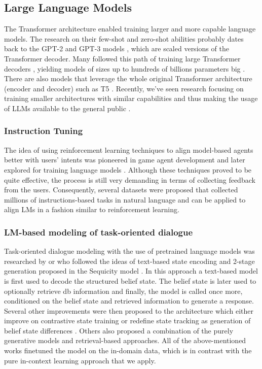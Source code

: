 \subsection{Large Language Models}
\label{relwork:llm-dialogue}
The Transformer architecture \cite{vaswani2017attention} enabled training larger and more capable language models.
The research on their few-shot and zero-shot abilities probably dates back to the GPT-2 and GPT-3 models \cite{radford2019language,brown2020language}, which are scaled versions of the Transformer decoder.
Many followed this path of training large Transformer decoders \cite{zhang2022opt,black2022gpt}, yielding models of sizes up to hundreds of billions parameters big \cite{zhao_survey_2023}.
There are also models that leverage the whole original Transformer architecture (encoder and decoder) such as T5 \cite{2020t5}.
Recently, we've seen research focusing on training smaller architectures with similar capabilities and thus making the usage of LLMs available to the general public \cite{touvron2023llama}.

\subsubsection{Instruction Tuning}
The idea of using reinforcement learning techniques to align model-based agents better with users' intents was pioneered in game agent development \cite{christiano2017deep} and later explored for training language models \cite{ziegler2019fine,ouyang2022training}.
Although these techniques proved to be quite effective, the process is still very demanding in terms of collecting feedback from the users.
Consequently, several datasets were proposed \cite{supernaturalinstructions,iyer2022opt,black2022gpt} that collected millions of instructions-based tasks in natural language and can be applied to align LMs in a fashion similar to reinforcement learning.

\subsubsection{LM-based modeling of task-oriented dialogue}
Task-oriented dialogue modeling with the use of pretrained language models was researched by \citet{zhang2019dialogpt} or \citet{peng-etal-2021-soloist} who followed the ideas of text-based state encoding and 2-stage generation proposed in the Sequicity model \cite{lei2018sequicity}.
In this approach a text-based model is first used to decode the structured belief state.
The belief state is later used to optionally retrieve db information and finally, the model is called once more, conditioned on the belief state and retrieved information to generate a response.
Several other improvements were then proposed to the architecture which either improve on contrastive state training \cite{kulhanek-etal-2021-augpt} or redefine state tracking as generation of belief state differences \cite{lin-etal-2020-mintl}.
Others also proposed a combination of the purely generative models and retrieval-based approaches\cite{pandey-etal-2018-exemplar,cai-etal-2019-retrieval,nekvinda-dusek-2022-aargh}.
All of the above-mentioned works finetuned the model on the in-domain data, which is in contrast with the pure in-context learning approach that we apply.

